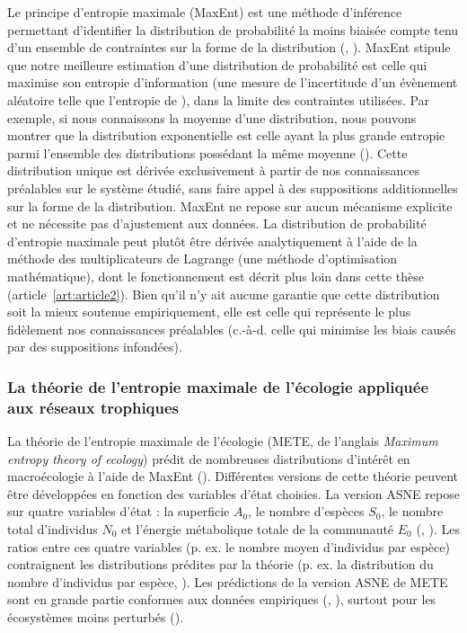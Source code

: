 Le principe d'entropie maximale (MaxEnt) est une méthode d'inférence permettant
d'identifier la distribution de probabilité la moins biaisée compte tenu d'un
ensemble de contraintes sur la forme de la distribution
(\cite{Jaynes1957Informationa}, \cite{Jaynes1957Information}). MaxEnt stipule
que notre meilleure estimation d'une distribution de probabilité est celle qui
maximise son entropie d'information (une mesure de l'incertitude d'un évènement
aléatoire telle que l'entropie de \cite{Shannon1948Mathematical}), dans
la limite des contraintes utilisées. Par exemple, si nous connaissons la moyenne
d'une distribution, nous pouvons montrer que la distribution exponentielle est
celle ayant la plus grande entropie parmi l'ensemble des distributions possédant
la même moyenne (\cite{Frank2011Simple}). Cette distribution unique est dérivée
exclusivement à partir de nos connaissances préalables sur le système étudié,
sans faire appel à des suppositions additionnelles sur la forme de la
distribution. MaxEnt ne repose sur aucun mécanisme explicite et ne nécessite pas
d'ajustement aux données. La distribution de probabilité d'entropie maximale
peut plutôt être dérivée analytiquement à l'aide de la méthode des
multiplicateurs de Lagrange (une méthode d'optimisation mathématique), dont le
fonctionnement est décrit plus loin dans cette thèse
(article~\ref{art:article2}). Bien qu'il n'y ait aucune garantie que cette
distribution soit la mieux soutenue empiriquement, elle est celle qui représente
le plus fidèlement nos connaissances préalables (c.-à-d. celle qui minimise les
biais causés par des suppositions infondées). 

\subsubsection{La théorie de l'entropie maximale de l'écologie appliquée aux réseaux trophiques} 

La théorie de l'entropie maximale de l'écologie (METE, de l'anglais
\textit{Maximum entropy theory of ecology}) prédit de nombreuses distributions
d'intérêt en macroécologie à l'aide de MaxEnt (\cite{Harte2011Maximum}).
Différentes versions de cette théorie peuvent être développées en fonction des
variables d'état choisies. La version ASNE repose sur quatre variables d'état :
la superficie $A_0$, le nombre d'espèces $S_0$, le nombre total d'individus
$N_0$ et l'énergie métabolique totale de la communauté $E_0$
(\cite{Harte2008Maximum}, \cite{Harte2014Maximum}). Les ratios entre ces quatre
variables (p. ex. le nombre moyen d'individus par espèce) contraignent les
distributions prédites par la théorie (p. ex. la distribution du nombre
d'individus par espèce, \cite{Brummer2019Derivations}). Les prédictions de la
version ASNE de METE sont en grande partie conformes aux données empiriques
(\cite{Harte2011Maximum}, \cite{McGlinn2015Exploring}), surtout pour les
écosystèmes moins perturbés (\cite{Newman2020Disturbance}). 

